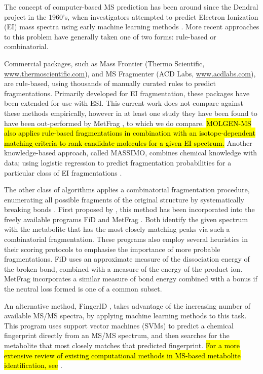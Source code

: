 The concept of computer-based MS prediction has been around since the Dendral project in the 1960's, when investigators attempted to predict Electron Ionization (EI) mass spectra using early machine learning methods \citep{Lindsay1980}. 
More recent approaches to this problem have generally taken one of two forms: rule-based or combinatorial. 

Commercial packages, such as Mass Frontier (Thermo Scientific, \url{www.thermoscientific.com}), and MS Fragmenter (ACD Labs, \url{www.acdlabs.com}), are rule-based, using thousands of manually curated rules to predict fragmentations.  
Primarily developed for EI fragmentation, these packages have been extended for use with ESI.
This current work does not compare against these methods empirically, however in at least one study they have been found to have been out-performed by MetFrag \citep{Wolf2010}, to which we do compare.
\hl{MOLGEN-MS }\citep{Kerber2006}\hl{ also applies rule-based fragmentations in combination with an isotope-dependent matching criteria to rank candidate molecules for a given EI spectrum.} 
Another knowledge-based approach, called MASSIMO, combines chemical knowledge with data; using logistic regression to predict fragmentation probabilities for a particular class of EI fragmentations \citep{Gasteiger1992}. 


The other class of algorithms applies a combinatorial fragmentation procedure, enumerating all possible fragments of the original structure by systematically breaking bonds \citep{Hill2005, Kokkonen2008, Wolf2010}. 
First proposed by \citet{Hill2005}, this method has been incorporated into the freely available programs FiD \citep{Kokkonen2008} and MetFrag \citep{Wolf2010}. 
Both identify the given spectrum with the metabolite that has the most closely matching peaks via such a combinatorial fragmentation. 
These programs also employ several heuristics in their scoring protocols to emphasise the importance of more probable fragmentations. 
FiD uses an approximate measure of the dissociation energy of the broken bond, combined with a measure of the energy of the product ion. 
MetFrag incorporates a similar measure of bond energy combined with a bonus if the neutral loss formed is one of a common subset.

An alternative method, FingerID \citep{Heinonen2012}, takes advantage of the increasing number of available MS/MS spectra, by applying machine learning methods to this task. 
This program uses support vector machines (SVMs) to predict a chemical fingerprint directly from an MS/MS spectrum, and then searches for the metabolite that most closely matches that predicted fingerprint. 
\hl{For a more extensive review of existing computational methods in MS-based metabolite identification, see} \citet{Hufsky2014}.



